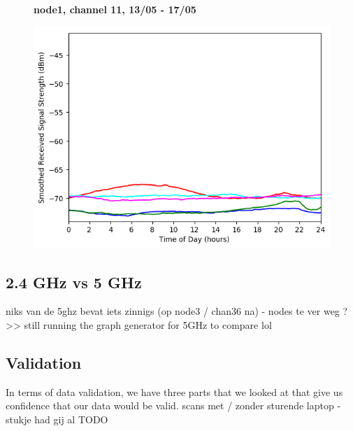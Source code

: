 \documentclass[a4paper, 11pt]{article}
\begin{document}
\begin{figure}[h!]
    \centering
    \textbf{node1, channel 11, 13/05 - 17/05}\par\medskip
	\includegraphics[scale=0.5]{images/2_4_GHz/node1_2017-05-17_chan11_image.png}
\end{figure}
\subsection{2.4 GHz vs 5 GHz}
niks van de 5ghz bevat iets zinnigs (op node3 / chan36 na) - nodes te ver weg ?
>> still running the graph generator for 5GHz to compare lol
\subsection{Validation}
In terms of data validation, we have three parts that we looked at that give us confidence that our data would be valid.
scans met / zonder sturende laptop - stukje had gij al TODO
\end{document}
